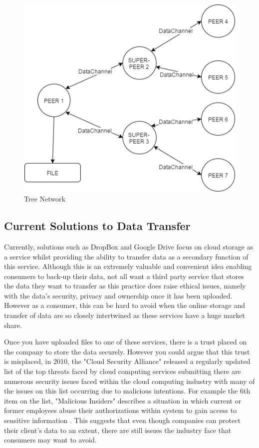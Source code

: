 \documentclass[]{report}
\begin{document}
			\begin{figure}[h!]
				\centering
				\caption{Tree Network}
				\includegraphics[scale=0.4]{treetopology.png}
			\end{figure}			
			\subsection*{Current Solutions to Data Transfer}
			Currently, solutions such as DropBox and Google Drive focus on cloud storage as a service whilst providing the ability to transfer data as a secondary function of this service. Although this is an extremely valuable and convenient idea enabling consumers to back-up their data, not all want a third party service that stores the data they want to transfer as this practice does raise ethical issues, namely with the data's security, privacy and ownership once it has been uploaded. However as a consumer, this can be hard to avoid when the online storage and transfer of data are so closely intertwined as these services have a huge market share.
			
			Once you have uploaded files to one of these services, there is a trust placed on the company to store the data securely. However you could argue that this trust is misplaced, in 2010, the "Cloud Security Alliance" released a regularly updated list of the top threats faced by cloud computing services submitting there are numerous security issues faced within the cloud computing industry with many of the issues on this list occurring due to malicious intentions. For example the 6th item on the list, "Malicious Insiders" describes a situation in which current or former employees abuse their authorizations within system to gain access to sensitive information \cite{CSA Top Threats}. This suggests that even though companies can protect their client's data to an extent, there are still issues the industry face that consumers may want to avoid.
		 
\end{document}
